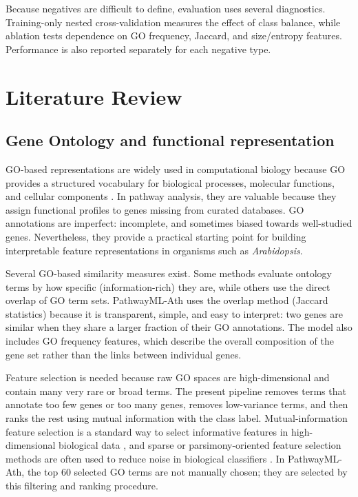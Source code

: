 \documentclass[12pt,twoside]{article}
\begin{document}
Because negatives are difficult to define, evaluation uses several diagnostics. Training-only nested cross-validation measures the effect of class balance, while ablation tests dependence on GO frequency, Jaccard, and size/entropy features. Performance is also reported separately for each negative type.

\section{Literature Review}
\label{sec:literature_review}

\subsection{Gene Ontology and functional representation}
\label{sec:lit_go}

GO-based representations are widely used in computational biology because GO provides a structured vocabulary for biological processes, molecular functions, and cellular components \citep{ashburner2000gene,geneontology2023}. In pathway analysis, they are valuable because they assign functional profiles to genes missing from curated databases. GO annotations are imperfect: incomplete, and sometimes biased towards well-studied genes. Nevertheless, they provide a practical starting point for building interpretable feature representations in organisms such as \textit{Arabidopsis}.

Several GO-based similarity measures exist. Some methods evaluate ontology terms by how specific (information-rich) they are, while others use the direct overlap of GO term sets. PathwayML-Ath uses the overlap method (Jaccard statistics) because it is transparent, simple, and easy to interpret: two genes are similar when they share a larger fraction of their GO annotations. The model also includes GO frequency features, which describe the overall composition of the gene set rather than the links between individual genes.

Feature selection is needed because raw GO spaces are high-dimensional and contain many very rare or broad terms. The present pipeline removes terms that annotate too few genes or too many genes, removes low-variance terms, and then ranks the rest using mutual information with the class label. Mutual-information feature selection is a standard way to select informative features in high-dimensional biological data \citep{dingpeng2003}, and sparse or parsimony-oriented feature selection methods are often used to reduce noise in biological classifiers \citep{tibshirani1996regression}. In PathwayML-Ath, the top 60 selected GO terms are not manually chosen; they are selected by this filtering and ranking procedure.
\end{document}

